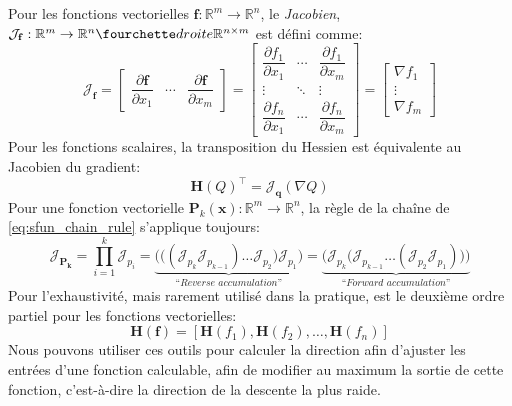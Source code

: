 %
Pour les fonctions vectorielles $\mathbf{f} : \mathbb{R}^m\rightarrow\mathbb{R}^n$, le \textit{Jacobien}, $\mathcal{J}_{\mathbf{f}} : \mathbb{R}^m\rightarrow\mathbb{R}^n\fourchette droite\mathbb{R}^{n \times m}$ est défini comme:
%
\begin{equation}
    \mathcal{J}_{\mathbf{f}} =
    \begin{bmatrix}
        \dfrac{\partial \mathbf{f}}{\partial x_1} & \cdots & \dfrac{\partial \mathbf{f}}{\partial x_m}
    \end{bmatrix} =
    \begin{bmatrix}
        \dfrac{\partial f_1}{\partial x_1} & \cdots & \dfrac{\partial f_1}{\partial x_m}\\
        \vdots & \ddots & \vdots\\
        \dfrac{\partial f_n}{\partial x_1} & \cdots & \dfrac{\partial f_n}{\partial x_m}
    \end{bmatrix} =
    \begin{bmatrix}
        \nabla f_1 \\
        \vdots \\
        \nabla f_m
    \end{bmatrix}
\end{equation}
%
Pour les fonctions scalaires, la transposition du Hessien est équivalente au Jacobien du gradient:
%
\begin{equation}
    \mathbf{H}(Q)^\intercal = \mathcal{J}_\mathbf{q}(\nabla Q)
\end{equation}
%
Pour une fonction vectorielle $\mathbf{P}_k(\mathbf{x}) : \mathbb{R}^m\rightarrow\mathbb{R}^n$, la règle de la chaîne de \autoref{eq:sfun_chain_rule} s'applique toujours:
%
\begin{equation} \label{eq:vfun_chain_rule}
\mathcal{J}_\mathbf{P_k} = \displaystyle \prod_{i=1}^{k} \mathcal{J}_{p_i} = \underbrace{\bigg(\Big((\mathcal{J}_{p_k} \mathcal{J}_{p_{k-1}}) \dots \mathcal{J}_{p_2}\Big) \mathcal{J}_{p_1}\bigg)}_{\textit{``Reverse accumulation''}} = \underbrace{\bigg(\mathcal{J}_{p_k} \Big(\mathcal{J}_{p_{k-1}} \dots (\mathcal{J}_{p_2} \mathcal{J}_{p_1})\Big)\bigg)}_{\textit{``Forward accumulation''}}
\end{equation}
%
Pour l'exhaustivité, mais rarement utilisé dans la pratique, est le deuxième ordre partiel pour les fonctions vectorielles:
%
\begin{equation}
    \mathbf{H} (\mathbf {f} )=[\mathbf {H} (f_{1}), \mathbf {H} (f_{2}), \dots, \mathbf {H} (f_{n})]
\end{equation}
%
Nous pouvons utiliser ces outils pour calculer la direction afin d'ajuster les entrées d'une fonction calculable, afin de modifier au maximum la sortie de cette fonction, c'est-à-dire la direction de la descente la plus raide.

